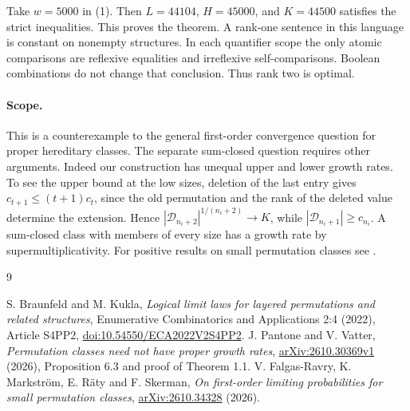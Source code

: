 \documentclass[11pt]{article}
\newcommand{\D}{\mathcal D}
\begin{document}
Take $w=5000$ in (1). Then $L=44104$, $H=45000$, and $K=44500$ satisfies the strict inequalities. This proves the theorem. A rank-one sentence in this language is constant on nonempty structures. In each quantifier scope the only atomic comparisons are reflexive equalities and irreflexive self-comparisons. Boolean combinations do not change that conclusion. Thus rank two is optimal.

\paragraph{Scope.}
This is a counterexample to the general first-order convergence question for proper hereditary classes. The separate sum-closed question \cite[Question 5.3]{bk} requires other arguments. Indeed our construction has unequal upper and lower growth rates. To see the upper bound at the low sizes, deletion of the last entry gives $c_{t+1}\le(t+1)c_t$, since the old permutation and the rank of the deleted value determine the extension. Hence $|\D_{n_i+2}|^{1/(n_i+2)}\to K$, while $|\D_{n_i+1}|\ge c_{n_i}$. A sum-closed class with members of every size has a growth rate by supermultiplicativity. For positive results on small permutation classes see \cite{small}.

\begin{thebibliography}{9}\raggedright
{} S. Braunfeld and M. Kukla, \emph{Logical limit laws for layered permutations and related structures}, Enumerative Combinatorics and Applications 2:4 (2022), Article S4PP2, \href{https://doi.org/10.54550/ECA2022V2S4PP2}{doi:10.54550/ECA2022V2S4PP2}.
 J. Pantone and V. Vatter, \emph{Permutation classes need not have proper growth rates}, \href{https://arxiv.org/abs/2610.30369v1}{arXiv:2610.30369v1} (2026), Proposition 6.3 and proof of Theorem 1.1.
 V. Falgas-Ravry, K. Markstr\"om, E. R\"aty and F. Skerman, \emph{On first-order limiting probabilities for small permutation classes}, \href{https://arxiv.org/abs/2610.34328}{arXiv:2610.34328} (2026).
\end{thebibliography}
\end{document}
